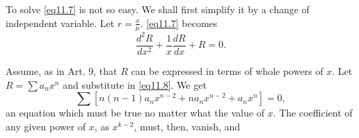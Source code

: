 \documentclass[oneside,12pt]{book}
\begin{document}
To solve \eqref{eq11.7} is not so easy. We shall first simplify it by a change of independent variable. Let $r=\frac{x}{\mu}$. \eqref{eq11.7} becomes 
\begin{equation}
    \frac{d^2R}{dx^2}+\frac{1}{x}\frac{dR}{dx}+R=0. \label{eq11.8}
\end{equation} \par 

Assume, as in Art. 9, that $R$ can be expressed in terms of whole powers of $x$. Let $R=\sum a_nx^n$ and substitute in \eqref{eq11.8}. We get 
\begin{equation*}
    \sum[n(n-1)a_nx^{n-2}+na_nx^{n-2}+a_nx^n]=0,
\end{equation*}
an equation which must be true no matter what the value of $x$. The coefficient of any given power of $x$, as $x^{k-2}$, must, then, vanish, and 
\end{document}
